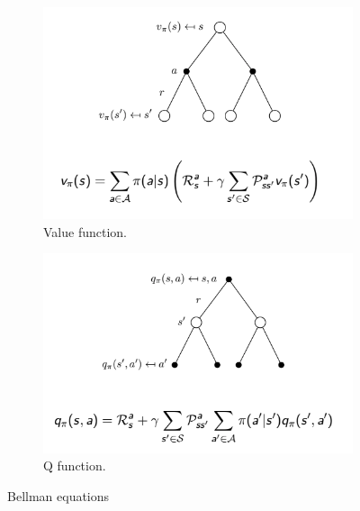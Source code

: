 \documentclass[11pt]{book} %
\begin{document}
\begin{figure}
    \begin{subfigure}[b]{0.5\textwidth}
        \centering
        \includegraphics[width=\textwidth]{./Figs/bellman-value.png}
        \caption{Value function.}
        \label{fig:mdp}
    \end{subfigure}
    \begin{subfigure}[b]{0.5\textwidth}
        \centering
        \includegraphics[width=\textwidth]{./Figs/bellman-q.png}
        \caption{Q function.}
        \label{fig:mdp_graph}
    \end{subfigure}
    \label{fig:mdp}
    \caption{Bellman equations}
\end{figure}
\end{document}
